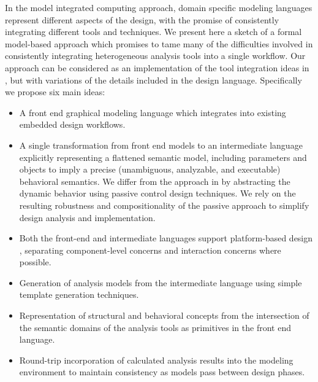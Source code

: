 In the model integrated computing approach, domain specific modeling languages represent 
different aspects of the design, with the promise of consistently integrating different tools 
and techniques.  We present here a sketch of a formal model-based approach which promises to tame 
many of the difficulties involved in consistently integrating heterogeneous analysis tools into a 
single workflow.  Our approach can be considered as an implementation of the tool integration ideas 
in \cite{modeling:hybrid_abs}, but with variations of the details included in the design language.  
Specifically we propose six main ideas:

\begin{itemize}

\item A front end graphical modeling language which integrates into existing embedded design 
workflows\cite{modeling:aces08}\cite{sched:analysis}.

\item A single transformation from front end models to an intermediate language explicitly 
representing a flattened semantic model, including parameters and objects to imply a precise 
(unambiguous, analyzable, and executable) behavioral semantics.  We differ from the approach 
in \cite{modeling:hybrid_abs} by abstracting the dynamic behavior using passive control design 
techniques. We rely on the resulting robustness and compositionality of the passive approach 
to simplify design analysis and implementation.

\item Both the front-end and intermediate languages support platform-based design \cite{modeling:platform}, 
separating component-level concerns and interaction concerns where possible.

\item Generation of analysis models from the intermediate language using simple template generation techniques.

\item Representation of structural and behavioral concepts from the intersection of the semantic 
domains of the analysis tools as primitives in the front end language.

\item Round-trip incorporation of calculated analysis results into the modeling environment to 
maintain consistency as models pass between design phases.

\end{itemize}

